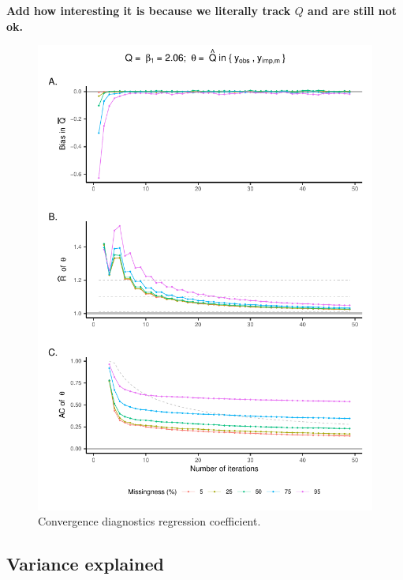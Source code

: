 \documentclass[Royal,times,sageh]{sagej}
\begin{document}
\textbf{Add how interesting it is because we literally track \(Q\) and are still not ok.}

\begin{figure}

{\centering \includegraphics{manuscript_files/figure-latex/est-1} 

}

\caption{Convergence diagnostics regression coefficient.}\label{fig:est}
\end{figure}

\hypertarget{variance-explained}{%
\subsection{Variance explained}\label{variance-explained}}
\end{document}
